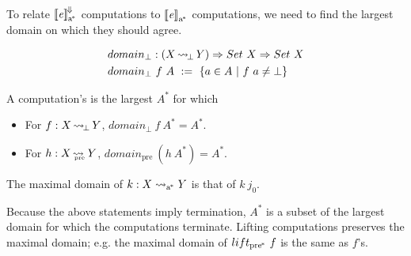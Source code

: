 \documentclass{llncs}
\newcommand{\arrow}{\rightsquigarrow}
\newcommand{\conv}{^{\mspace{-2mu}\Downarrow\mspace{-2mu}}}
\newcommand{\meaningofconv}[1]{\left\llbracket{#1}\right\rrbracket\conv}
\newcommand{\arrowlift}{\ensuremath{lift}}
\newcommand{\genc}{_\mathrm{a^{\mspace{-2mu}*}}}
\DeclareMathOperator{\botto}{\arrow_{\mspace{-3mu}\bot}}
\newcommand{\pre}{_\mathrm{pre}}
\DeclareMathOperator{\preto}{\arrow_{\mspace{-19mu}\pre}}
\newcommand{\ppre}{_\mathrm{pre^{\mspace{-2mu}*}}}
\newcommand{\liftppre}{\arrowlift\ppre}
\begin{document}
To relate $\meaningofconv{\mathit{e}}\genc$ computations to $\meaningof{\mathit{e}}\genc$ computations, we need to find the largest domain on which they should agree.

\begin{equation}
\begin{aligned}
	&domain_\bot : (X \botto Y) \tto Set~X \tto Set~X \\
	&domain_\bot~f~A \ := \ \setb{a \in A}{f~a \neq \bot}
\end{aligned}
\end{equation}

\begin{definition}
\label{def:maximal-domain}
A computation's  is the largest $A^*$ for which
\begin{itemize}
	\item For $f : X \botto Y$, $domain_\bot~f~A^* = A^*$.
	\item For $h : X \preto Y$, $domain\pre~(h~A^*) = A^*$.
\end{itemize}
The maximal domain of $k : X \arrow\genc Y$ is that of $k~j_0$.%
\end{definition}

Because the above statements imply termination, $A^*$ is a subset of the largest domain for which the computations terminate.
Lifting computations preserves the maximal domain; e.g. the maximal domain of $\liftppre~f$ is the same as $f$'s.

\begin{comment}

\begin{definition}[index prefix/suffix]
\label{def:index-prefix}
A finite $J' \subset J$ is an \mykeyword{index prefix} if $J' = \set{j_0}$ or, for some index prefix $J''$ and $j \in J''$, $J' = J'' \uplus \set{left~j}$ or $J' = J'' \uplus \set{right~j}$.
The corresponding \mykeyword{index suffix} is $J \w J'$.
\end{definition}

It is not hard to show that every index suffix is closed under $left$ and $right$.

For a given $t \in T$, an index prefix $J'$ serves as a convenient bounding set for the finitely many indexes $j$ for which $t~j \neq \bot$.
Applying $left$ and/or $right$ repeatedly to any $j \in J'$ eventually yields a $j' \in J \w J'$, for which $t~j' = \bot$.
\end{comment}
\end{document}
